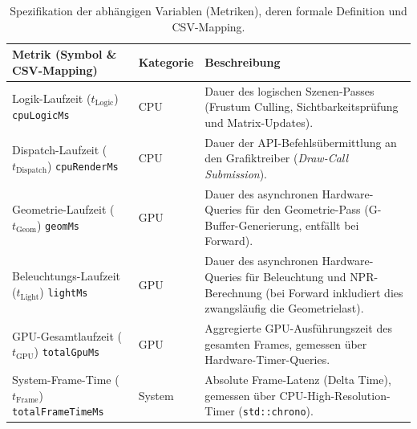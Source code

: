 \begin{table}[htbp]
    \centering
    \caption{Spezifikation der abhängigen Variablen (Metriken), deren formale Definition und CSV-Mapping.}
    \label{tab:dependent_vars}
    \small
    \renewcommand{\arraystretch}{1.3}
    \begin{tabularx}{\textwidth}{@{} >{\raggedright\arraybackslash}p{4.8cm} l >{\raggedright\arraybackslash}X @{}}
        \toprule
        \textbf{Metrik (Symbol \& CSV-Mapping)}
        & \textbf{Kategorie}
        & \textbf{Beschreibung} \\
        \midrule

        Logik-Laufzeit ($t_{\text{Logic}}$) \newline \scriptsize{\texttt{cpuLogicMs}}
        & \ac{CPU}
        & Dauer des logischen Szenen-Passes (Frustum Culling, Sichtbarkeitsprüfung und Matrix-Updates). \\

        Dispatch-Laufzeit ($t_{\text{Dispatch}}$) \newline \scriptsize{\texttt{cpuRenderMs}}
        & \ac{CPU}
        & Dauer der \ac{API}-Befehlsübermittlung an den Grafiktreiber (\textit{Draw-Call Submission}). \\

        Geometrie-Laufzeit ($t_{\text{Geom}}$) \newline \scriptsize{\texttt{geomMs}}
        & \ac{GPU}
        & Dauer des asynchronen Hardware-Queries für den Geometrie-Pass (G-Buffer-Generierung, entfällt bei Forward). \\

        Beleuchtungs-Laufzeit ($t_{\text{Light}}$) \newline \scriptsize{\texttt{lightMs}}
        & \ac{GPU}
        & Dauer des asynchronen Hardware-Queries für Beleuchtung und \ac{NPR}-Berechnung (bei Forward inkludiert dies
        zwangsläufig die Geometrielast). \\

        \ac{GPU}-Gesamtlaufzeit ($t_{\text{GPU}}$) \newline \scriptsize{\texttt{totalGpuMs}}
        & \ac{GPU}
        & Aggregierte \ac{GPU}-Ausführungszeit des gesamten Frames, gemessen über Hardware-Timer-Queries. \\

        System-Frame-Time ($t_{\text{Frame}}$) \newline \scriptsize{\texttt{totalFrameTimeMs}}
        & System
        & Absolute Frame-Latenz (Delta Time), gemessen über \ac{CPU}-High-Resolution-Timer (\texttt{std::chrono}). \\


\end{tabularx}
\end{table}

